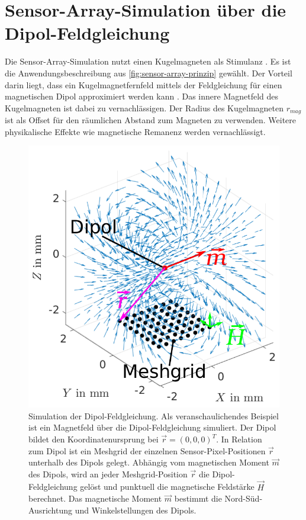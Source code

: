 %

\section{Sensor-Array-Simulation über die Dipol-Feldgleichung}\label{sec:sensor-array-simulation-dipol-feldgleichung}


Die Sensor-Array-Simulation nutzt einen Kugelmagneten als Stimulanz \cite{Schuethe2019}. Es ist die Anwendungsbeschreibung aus \autoref{fig:sensor-array-prinzip} gewählt. Der Vorteil darin liegt, dass ein Kugelmagnetfernfeld mittels der Feldgleichung für einen magnetischen Dipol approximiert werden kann \cite{Pape2017}. Das innere Magnetfeld des Kugelmagneten ist dabei zu vernachlässigen. Der Radius des Kugelmagneten $r_{mag}$ ist als Offset für den räumlichen Abstand zum Magneten zu verwenden. Weitere physikalische Effekte wie magnetische Remanenz werden vernachlässigt.



\begin{figure}[ph]
	\centering
	\includegraphics[width=0.7\linewidth]{chapters/images/2-Grundlagen/Dipol-Feldgleichung}
	\caption[Simulation der Dipol-Feldgleichung]{Simulation der Dipol-Feldgleichung. Als veranschaulichendes Beispiel ist ein Magnetfeld über die Dipol-Feldgleichung simuliert. Der Dipol bildet den Koordinatenursprung bei $\vec{r} = (0,0,0)^T$. In Relation zum Dipol ist ein Meshgrid der einzelnen Sensor-Pixel-Positionen $\vec{r}$ unterhalb des Dipols gelegt. Abhängig vom magnetischen Moment $\vec{m}$ des Dipols, wird an jeder Meshgrid-Position $\vec{r}$ die Dipol-Feldgleichung gelöst und punktuell die magnetische Feldstärke $\vec{H}$ berechnet. Das magnetische Moment $\vec{m}$ bestimmt die Nord-Süd-Ausrichtung und Winkelstellungen des Dipols.}
	\label{fig:dipol-feldgleichung}
\end{figure}


